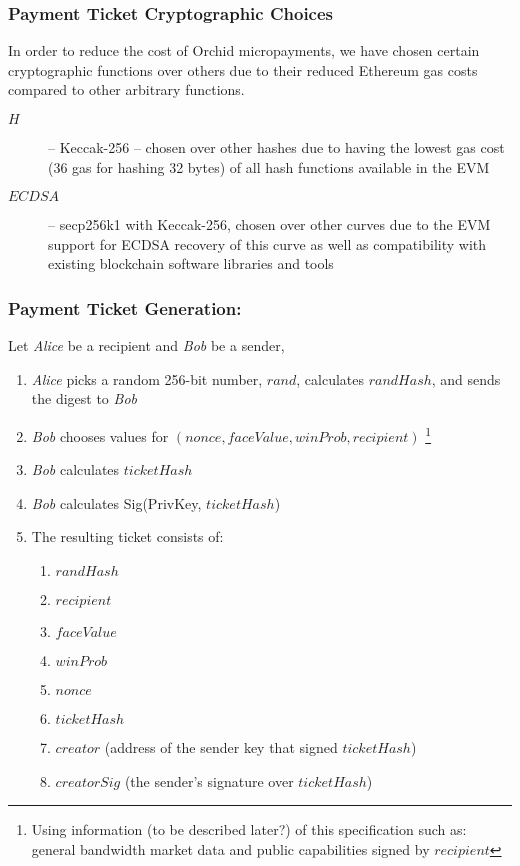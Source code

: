 \subsubsection{Payment Ticket Cryptographic Choices}
\label{payments-optimization}
In order to reduce the cost of Orchid micropayments, we have chosen certain cryptographic functions over others due to their reduced Ethereum gas costs compared to other arbitrary functions.
\begin{description}
    \item[$H$] -- Keccak-256 -- chosen over other hashes due to having the lowest gas cost (36 gas\cite{ETHSpec} for hashing 32 bytes) of all hash functions available in the EVM
    \item[$ECDSA$] -- secp256k1 with Keccak-256, chosen over other curves due to the EVM support for ECDSA recovery of this curve as well as compatibility with existing blockchain software libraries and tools
\end{description}

\subsubsection{Payment Ticket Generation:}
\label{payment-generation}

Let \textit{Alice} be a recipient and \textit{Bob} be a sender,
\begin{enumerate}
  \item \textit{Alice} picks a random 256-bit number, $rand$, calculates $randHash$, and sends the digest to \textit{Bob}
  \item \textit{Bob} chooses values for $(nonce, faceValue, winProb, recipient)$ \footnote{Using information {\color{red}(to be described later?}) of this specification such as: general bandwidth market data and public capabilities signed by $recipient$}
  \item \textit{Bob} calculates $ticketHash$
  \item \textit{Bob} calculates Sig(PrivKey, $ticketHash$)
  \item The resulting ticket consists of:
    \begin{enumerate}
      \item $randHash$
      \item $recipient$
      \item $faceValue$
      \item $winProb$
      \item $nonce$
      \item $ticketHash$
      \item $creator$ (address of the sender key that signed $ticketHash$)
      \item $creatorSig$ (the sender's signature over $ticketHash$)
     \end{enumerate}
\end{enumerate}

